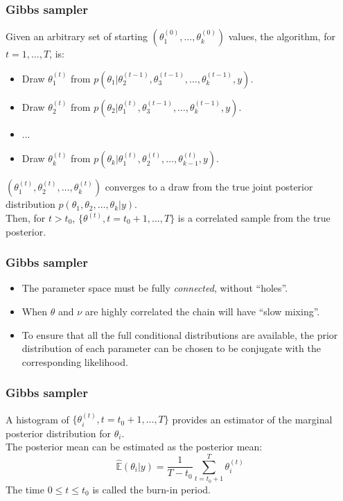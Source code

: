 \documentclass{beamer}
\newcommand{\E}{\mathbb{E}}
\newcommand{\1}{\ensuremath{\mathbf{1}}}
\begin{document}
%
%
%
\begin{frame}\frametitle{Gibbs sampler}
	Given an arbitrary set of starting $(\theta_1^{(0)}, ..., \theta_k^{(0)})$ values, the algorithm, for $t = 1,\ldots,T$, is:
	\begin{itemize}
		\item Draw $\theta_1^{(t)}$ from $p(\theta_1|\theta_2^{(t-1)},\theta_3^{(t-1)},\ldots,\theta_k^{(t-1)},y)$.
		\item Draw $\theta_2^{(t)}$ from $p(\theta_2|\theta_1^{(t)},\theta_3^{(t-1)},\ldots,\theta_k^{(t-1)},y)$.
		\item ...
		\item Draw $\theta_k^{(t)}$ from $p(\theta_k|\theta_1^{(t)},\theta_2^{(t)},\ldots,\theta_{k-1}^{(t)},y)$.
	\end{itemize}
	$(\theta_1^{(t)},\theta_2^{(t)},\ldots,\theta_{k}^{(t)})$ converges to a draw from the true joint posterior distribution $p(\theta_1,\theta_2,\ldots,\theta_k|y)$.\\[1.5ex]
	Then, for $t > t_0$, $\{\theta^{(t)},t = t_0 +1,\ldots,T\}$ is a correlated sample from the true posterior.
\end{frame}
%
%
%
\begin{frame}\frametitle{Gibbs sampler}
	\begin{itemize}
		\item The parameter space must be fully \emph{connected}, without ``holes''.
		\item When $\theta$ and $\nu$ are highly correlated the chain will have ``slow mixing''.
		\item To ensure that all the full conditional distributions are available, the prior distribution of each parameter can be chosen to be conjugate with the corresponding likelihood.
	\end{itemize}
\end{frame}
%
%
%
\begin{frame}\frametitle{Gibbs sampler}
	A histogram of $\{\theta_i^{(t)},t = t_0 +1,\ldots,T\}$ provides an estimator of the marginal posterior distribution for $\theta_i$.\\[2ex]
	The posterior mean can be estimated as the posterior mean:
	\begin{equation}
		\hat{\E}(\theta_i|y) = \frac{1}{T-t_0}\sum_{t=t_0+1}^T \theta_i^{(t)}
	\end{equation}
	The time $0 \leq t \leq t_0$ is called the burn-in period.
\end{frame}
\end{document}
